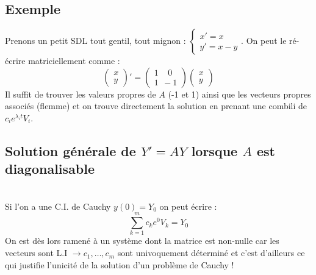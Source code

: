 \documentclass[british,french,11pt, a4paper, openany]{book}
\begin{document}
\subsection{Exemple}
Prenons un petit SDL tout gentil, tout mignon : $\left\{\begin{array}{l}
x' = x\\
y' = x-y
\end{array}\right.$. On peut le ré-écrire matriciellement comme :
\begin{equation}
	\left(\begin{array}{l}
	x\\
	y
	\end{array}\right)' = \left(\begin{array}{l}
	1\ \ \  \ \ 0\\
	1\ \ -1
	\end{array}\right)\left(\begin{array}{l}
	x\\
	y
	\end{array}\right)
\end{equation}
Il suffit de trouver les valeurs propres de $A$ (-1 et 1) ainsi que les vecteurs propres associés (flemme) et on trouve directement la solution en prenant une combili de $c_ie^{\lambda_i t}V_i$.
		
\subsection{Solution générale de $Y' = AY$ lorsque $A$ est diagonalisable}
\ \\
		
Si l'on a une C.I. de Cauchy $y(0) = Y_0$ on peut écrire :
\begin{equation}
	\sum_{k=1}^m c_k e^0 V_k = Y_0
\end{equation}
On est dès lors ramené à un système dont la matrice est non-nulle car les vecteurs sont L.I $\rightarrow c_1, \dots,c_m$ sont univoquement déterminé et c'est d'ailleurs ce qui justifie l'unicité de la solution d'un problème de Cauchy !\\
		
\end{document}
